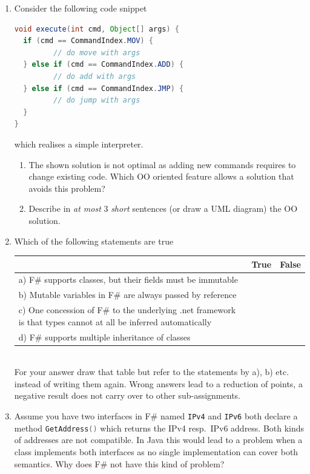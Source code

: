 \documentclass{article}
\begin{document}
\begin{enumerate}
\item Consider the following code snippet
\begin{lstlisting}[language=Java, columns=flexible, basicstyle=\small]
void execute(int cmd, Object[] args) {
  if (cmd == CommandIndex.MOV) { 
         // do move with args 
  } else if (cmd == CommandIndex.ADD) {
         // do add with args
  } else if (cmd == CommandIndex.JMP) {
         // do jump with args
  }
}
\end{lstlisting}
which realises a simple interpreter. 
\begin{enumerate}
\item The shown solution is not optimal as adding new commands
  requires to change existing code. Which OO oriented feature allows a
  solution that avoids this problem? 
\item Describe in \emph{at most} 3 \emph{short} sentences (or draw a
  UML diagram) the OO solution. 
\end{enumerate}
\item Which of the following statements are true\\
    \begin{tabular}{|p{6cm}|c|c|}\hline
      & True & False \\ \hline
     a) F\# supports classes, but their fields must be immutable & & \\\hline
     b) Mutable variables in F\# are always passed by reference & & \\\hline
     c) One concession of F\#  to the underlying \textsf{.net}
     framework is that types cannot at all be inferred automatically & & \\\hline
     d) F\# supports multiple inheritance of classes & & \\\hline
   \end{tabular}\\
   For your answer draw that table but refer to the statements by a),
   b) etc. instead of writing them again. Wrong answers lead to a
   reduction of points, a negative result does not carry over to other
   sub-assignments. 
 \item Assume you have two interfaces in F\# named
   \lstinline[language=FSharp]{IPv4} and
   \lstinline[language=FSharp]{IPv6} both declare a method
   \lstinline[language=FSharp]{GetAddress()} which returns the IPv4
   resp.\ IPv6 address. Both kinds of addresses are not compatible. In
   Java this would lead to a problem when a class implements both
   interfaces as no single implementation can cover both
   semantics. Why does F\# not have this kind of problem?  
\end{enumerate}
\end{document}
